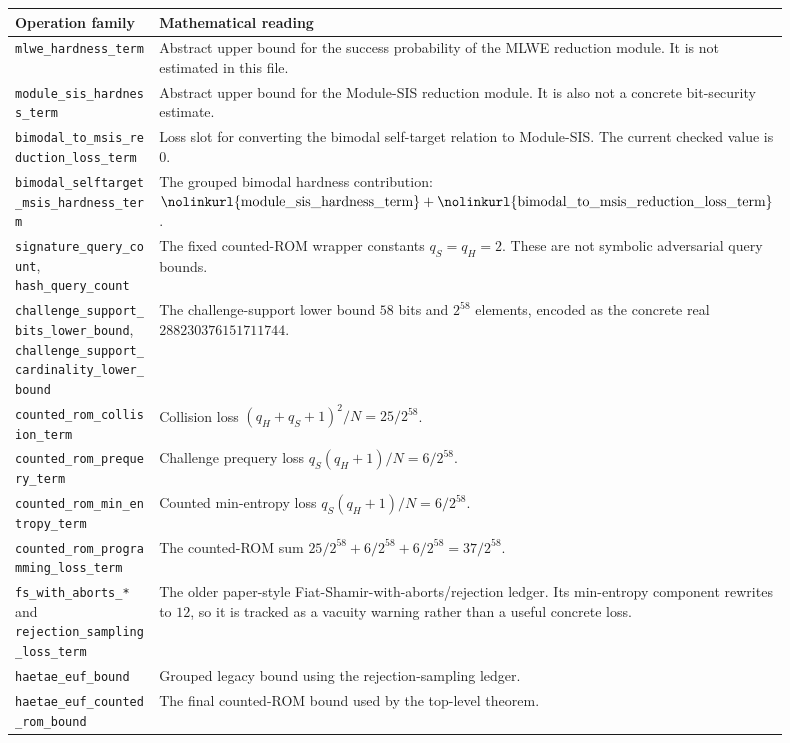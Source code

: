 \documentclass[11pt]{report}
\DeclareRobustCommand{\ec}[1]{\ifmmode\text{\nolinkurl{#1}}\else\nolinkurl{#1}\fi}
\theoremstyle{definition}
\theoremstyle{plain}
\begin{document}
\begin{longtable}{p{0.30\linewidth}p{0.60\linewidth}}
\toprule
\textbf{Operation family} & \textbf{Mathematical reading} \\
\midrule
\ec{mlwe\_hardness\_term} &
Abstract upper bound for the success probability of the MLWE reduction module.
It is not estimated in this file. \\
\ec{module\_sis\_hardness\_term} &
Abstract upper bound for the Module-SIS reduction module.  It is also not a
concrete bit-security estimate. \\
\ec{bimodal\_to\_msis\_reduction\_loss\_term} &
Loss slot for converting the bimodal self-target relation to Module-SIS.  The
current checked value is \(0\). \\
\ec{bimodal\_selftarget\_msis\_hardness\_term} &
The grouped bimodal hardness contribution:
\(\ec{module\_sis\_hardness\_term}+
\ec{bimodal\_to\_msis\_reduction\_loss\_term}\). \\
\ec{signature\_query\_count}, \ec{hash\_query\_count} &
The fixed counted-ROM wrapper constants \(q_S=q_H=2\).  These are not symbolic
adversarial query bounds. \\
\ec{challenge\_support\_bits\_lower\_bound},
\ec{challenge\_support\_cardinality\_lower\_bound} &
The challenge-support lower bound \(58\) bits and \(2^{58}\) elements, encoded
as the concrete real \(288230376151711744\). \\
\ec{counted\_rom\_collision\_term} &
Collision loss \((q_H+q_S+1)^2/N = 25/2^{58}\). \\
\ec{counted\_rom\_prequery\_term} &
Challenge prequery loss \(q_S(q_H+1)/N = 6/2^{58}\). \\
\ec{counted\_rom\_min\_entropy\_term} &
Counted min-entropy loss \(q_S(q_H+1)/N = 6/2^{58}\). \\
\ec{counted\_rom\_programming\_loss\_term} &
The counted-ROM sum \(25/2^{58}+6/2^{58}+6/2^{58}=37/2^{58}\). \\
\ec{fs\_with\_aborts\_*} and \ec{rejection\_sampling\_loss\_term} &
The older paper-style Fiat-Shamir-with-aborts/rejection ledger.  Its
min-entropy component rewrites to \(12\), so it is tracked as a vacuity warning
rather than a useful concrete loss. \\
\ec{haetae\_euf\_bound} &
Grouped legacy bound using the rejection-sampling ledger. \\
\ec{haetae\_euf\_counted\_rom\_bound} &
The final counted-ROM bound used by the top-level theorem. \\
\bottomrule
\end{longtable}
\end{document}
